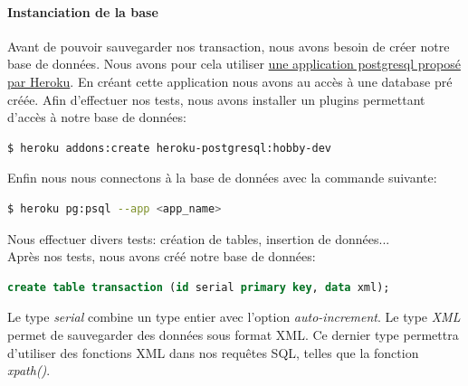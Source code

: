 \documentclass{article}
\begin{document}
	\paragraph{Instanciation de la base}
	  Avant de pouvoir sauvegarder nos transaction, nous avons besoin de créer notre base de données.
	  Nous avons pour cela utiliser \href{https://elements.heroku.com/addons/heroku-postgresql}{une application postgresql proposé par Heroku}.
	  En créant cette application nous avons au accès à une database pré créée.
	  Afin d'effectuer nos tests, nous avons installer un plugins permettant d'accès à notre base de données:
	  \begin{lstlisting}[language=bash]
    $ heroku addons:create heroku-postgresql:hobby-dev
	  \end{lstlisting}
	  Enfin nous nous connectons à la base de données avec la commande suivante:
	  \begin{lstlisting}[language=bash]
    $ heroku pg:psql --app <app_name>
	  \end{lstlisting}
	  Nous effectuer divers tests: création de tables, insertion de données...\\
	  Après nos tests, nous avons créé notre base de données:
	  \begin{lstlisting}[language=sql]
    create table transaction (id serial primary key, data xml);
	  \end{lstlisting}
	  Le type \emph{serial} combine un type entier avec l'option \emph{auto-increment}. Le type \emph{XML} permet de sauvegarder des données sous format XML. Ce dernier type permettra 
	  d'utiliser des fonctions XML dans nos requêtes SQL, telles que la fonction \emph{xpath()}.
\end{document}
